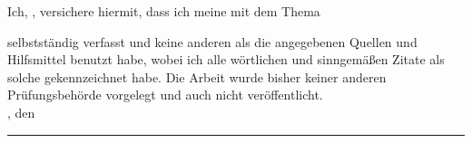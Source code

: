 \clearpage
{}


Ich, \autorName, versichere hiermit, dass ich meine \textbf{\betreff} mit dem
Thema
\begin{quote}
\textit{\kompletterTitel}
\end{quote}
selbstständig verfasst und keine anderen als die angegebenen Quellen und Hilfsmittel benutzt habe,
wobei ich alle wörtlichen und sinngemäßen Zitate als solche gekennzeichnet habe. Die Arbeit
wurde bisher keiner anderen Prüfungsbehörde vorgelegt und auch nicht veröffentlicht.\\[6ex]

\abgabeOrt, den \abgabeTermin


\rule[-0.2cm]{5.5cm}{0.5pt}

\textsc{\autorName}
